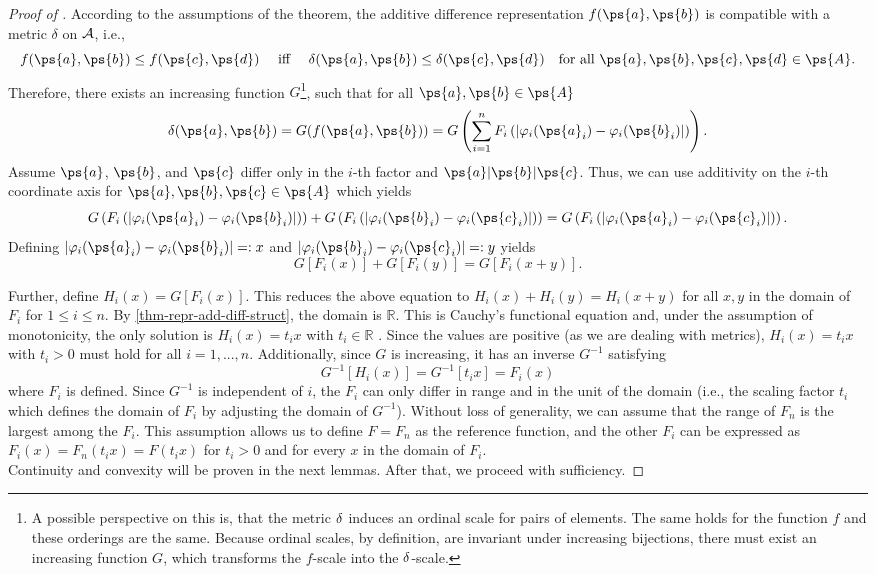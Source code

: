 \begin{proof}[Proof of ]
	According to the assumptions of the theorem, the additive difference representation $f(\ps{a},\ps{b})$ is compatible with a metric $\delta$ on $\mathcal{A}$, i.e.,
	$$
		f(\ps{a},\ps{b}) \leq f(\ps{c},\ps{d}) \quad \text{  iff  } \quad \delta(\ps{a},\ps{b}) \leq \delta(\ps{c},\ps{d}) \quad \text{for all } \ps{a}, \ps{b}, \ps{c}, \ps{d} \in \ps{A} .
	$$
	Therefore, there exists an increasing function $G$\footnote{A possible perspective on this is, that the metric $\operatorname{\delta}$ induces an ordinal scale for pairs of elements. The same holds for the function $f$ and these orderings are the same. Because ordinal scales, by definition, are invariant under increasing bijections, there must exist an increasing function $G$, which transforms the $f$-scale into the $\operatorname{\delta}$-scale.}, such that for all $\ps{a}, \ps{b} \in \ps{A}$
	$$
		\delta(\ps{a}, \ps{b}) = G(f(\ps{a},\ps{b})) =  G \left( \sum_{i=1}^{n} F_i \left( |\varphi_i(\ps{a}_i) - \varphi_i(\ps{b}_i)| \right) \right).
	$$
	Assume $\ps{a}$, $\ps{b}$, and $\ps{c}$ differ only in the $i$-th factor and $\ps{a}|\ps{b}|\ps{c}$. Thus, we can use additivity on the $i$-th coordinate axis for $\ps{a}, \ps{b}, \ps{c} \in \ps{A}$ which yields
	$$
		G \left( F_i \left( |\varphi_i(\ps{a}_i) - \varphi_i(\ps{b}_i)| \right) \right) + G \left( F_i \left( |\varphi_i(\ps{b}_i) - \varphi_i(\ps{c}_i)| \right) \right) = G \left( F_i \left( |\varphi_i(\ps{a}_i) - \varphi_i(\ps{c}_i)| \right) \right).
	$$
	Defining $|\varphi_i(\ps{a}_i) - \varphi_i(\ps{b}_i)| =: x$ and $|\varphi_i(\ps{b}_i) - \varphi_i(\ps{c}_i)| =: y$ yields
	$$
		G[F_i(x)] + G[F_i(y)] = G[F_i(x + y)].
	$$

	Further, define $H_i(x) = G[F_i(x)]$. This reduces the above equation to $H_i(x) + H_i(y) = H_i(x + y)$ for all $x, y$ in the domain of $F_i$ for $1 \leq i \leq n$. By \cref{thm-repr-add-diff-struct}, the domain is $\mathbb{R}$. This is Cauchy's functional equation and, under the assumption of monotonicity, the only solution is $H_i(x) = t_i x$ with $t_i \in \mathbb{R}$ \parencite[p. 15]{aczelFunctionalEquationsSeveral1989}. Since the values are positive (as we are dealing with metrics), $H_i(x) = t_i x$ with $t_i > 0$ must hold for all $i=1, ..., n$. Additionally, since $G$ is increasing, it has an inverse $G^{-1}$ satisfying
	$$
		G^{-1}[H_i(x)] = G^{-1}[t_i x] = F_i(x)
	$$
	where $F_i$ is defined. Since $G^{-1}$ is independent of $i$, the $F_i$ can only differ in range and in the unit of the domain (i.e., the scaling factor $t_i$ which defines the domain of $F_i$ by adjusting the domain of $G^{-1}$). Without loss of generality, we can assume that the range of $F_n$ is the largest among the $F_i$. This assumption allows us to define $F = F_n$ as the reference function, and the other $F_i$ can be expressed as $F_i(x) = F_n(t_i x) = F(t_i x)$ for $t_i > 0$ and for every $x$ in the domain of $F_i$.\\
	Continuity and convexity will be proven in the next lemmas. After that, we proceed with sufficiency.
\end{proof}

